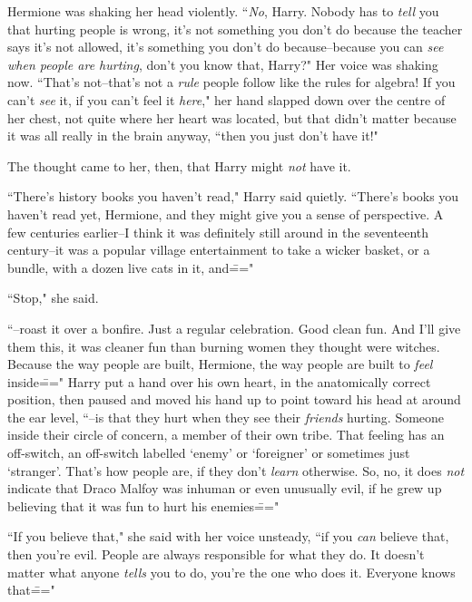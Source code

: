 Hermione was shaking her head violently. ``\emph{No}, Harry. Nobody has to \emph{tell} you that hurting people is wrong, it's not something you don't do because the teacher says it's not allowed, it's something you don't do because\---because you can \emph{see when people are hurting}, don't you know that, Harry?" Her voice was shaking now. ``That's not\---that's not a \emph{rule} people follow like the rules for algebra! If you can't \emph{see} it, if you can't feel it \emph{here}," her hand slapped down over the centre of her chest, not quite where her heart was located, but that didn't matter because it was all really in the brain anyway, ``then you just don't have it!"

The thought came to her, then, that Harry might \emph{not} have it.

``There's history books you haven't read," Harry said quietly. ``There's books you haven't read yet, Hermione, and they might give you a sense of perspective. A few centuries earlier\---I think it was definitely still around in the seventeenth century\---it was a popular village entertainment to take a wicker basket, or a bundle, with a dozen live cats in it, and\==="

``Stop," she said.

``\---roast it over a bonfire. Just a regular celebration. Good clean fun. And I'll give them this, it was cleaner fun than burning women they thought were witches. Because the way people are built, Hermione, the way people are built to \emph{feel} inside\===" Harry put a hand over his own heart, in the anatomically correct position, then paused and moved his hand up to point toward his head at around the ear level, ``\---is that they hurt when they see their \emph{friends} hurting. Someone inside their circle of concern, a member of their own tribe. That feeling has an off-switch, an off-switch labelled `enemy' or `foreigner' or sometimes just `stranger'. That's how people are, if they don't \emph{learn} otherwise. So, no, it does \emph{not} indicate that Draco Malfoy was inhuman or even unusually evil, if he grew up believing that it was fun to hurt his enemies\==="

``If you believe that," she said with her voice unsteady, ``if you \emph{can} believe that, then you're evil. People are always responsible for what they do. It doesn't matter what anyone \emph{tells} you to do, you're the one who does it. Everyone knows that\==="

